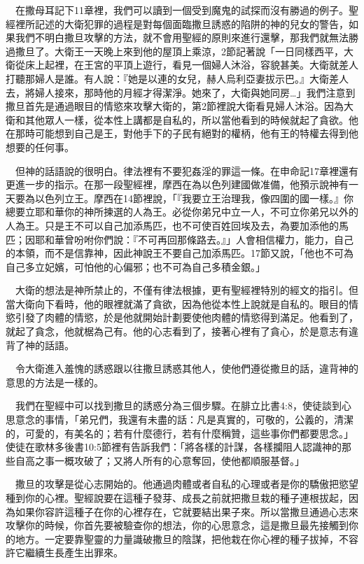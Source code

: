 \documentclass{book}
\begin{document}
　在撒母耳記下11章裡，我們可以讀到一個受到魔鬼的試探而沒有勝過的例子。聖經裡所記述的大衛犯罪的過程是對每個面臨撒旦誘惑的陷阱的神的兒女的警告，如果我們不明白撒旦攻擊的方法，就不會用聖經的原則來進行還擊，那我們就無法勝過撒旦了。大衛王一天晚上來到他的屋頂上乘涼，2節記著說「一日同樣西平，大衛從床上起裡，在王宮的平頂上遊行，看見一個婦人沐浴，容貌甚美。大衛就差人打聽那婦人是誰。有人說：『她是以連的女兒，赫人烏利亞妻拔示巴。』大衛差人去，將婦人接來，那時他的月經才得潔淨。她來了，大衛與她同房…」我們注意到撒旦首先是通過眼目的情慾來攻擊大衛的，第2節裡說大衛看見婦人沐浴。因為大衛和其他眾人一樣，從本性上講都是自私的，所以當他看到的時候就起了貪欲。他在那時可能想到自己是王，對他手下的子民有絕對的權柄，他有王的特權去得到他想要的任何事。

　但神的話語說的很明白。律法裡有不要犯姦淫的罪這一條。在申命記17章裡還有更進一步的指示。在那一段聖經裡，摩西在為以色列建國做准備，他預示說神有一天要為以色列立王。摩西在14節裡說，「『我要立王治理我，像四圍的國一樣。』你總要立耶和華你的神所揀選的人為王。必從你弟兄中立一人，不可立你弟兄以外的人為王。只是王不可以自己加添馬匹，也不可使百姓回埃及去，為要加添他的馬匹；因耶和華曾吩咐你們說：『不可再回那條路去。』」人會相信權力，能力，自己的本領，而不是信靠神，因此神說王不要自己加添馬匹。17節又說，「他也不可為自己多立妃嬪，可怕他的心偏邪；也不可為自己多積金銀。」

　大衛的想法是神所禁止的，不僅有律法根據，更有聖經裡特別的經文的指引。但當大衛向下看時，他的眼裡就滿了貪欲，因為他從本性上說就是自私的。眼目的情慾引發了肉體的情慾，於是他就開始計劃要使他肉體的情慾得到滿足。他看到了，就起了貪念，他就椐為己有。他的心志看到了，接著心裡有了貪心，於是意志有違背了神的話語。

　令大衛進入羞愧的誘惑跟以往撒旦誘惑其他人，使他們遵從撒旦的話，違背神的意思的方法是一樣的。

　我們在聖經中可以找到撒旦的誘惑分為三個步驟。在腓立比書4:8，使徒談到心思意念的事情，「弟兄們，我還有未盡的話：凡是真實的，可敬的，公義的，清潔的，可愛的，有美名的；若有什麼德行，若有什麼稱贊，這些事你們都要思念。」使徒在歌林多後書10:5節裡有告訴我們：「將各樣的計謀，各樣攔阻人認識神的那些自高之事一概攻破了；又將人所有的心意奪回，使他都順服基督。」

　撒旦的攻擊是從心志開始的。他通過肉體或者自私的心理或者是你的驕傲把慾望種到你的心裡。聖經說要在這種子發芽、成長之前就把撒旦栽的種子連根拔起，因為如果你容許這種子在你的心裡存在，它就要結出果子來。所以當撒旦通過心志來攻擊你的時候，你首先要被驗查你的想法，你的心思意念，這是撒旦最先接觸到你的地方。一定要靠聖靈的力量識破撒旦的陰謀，把他栽在你心裡的種子拔掉，不容許它繼續生長產生出罪來。
\end{document}
